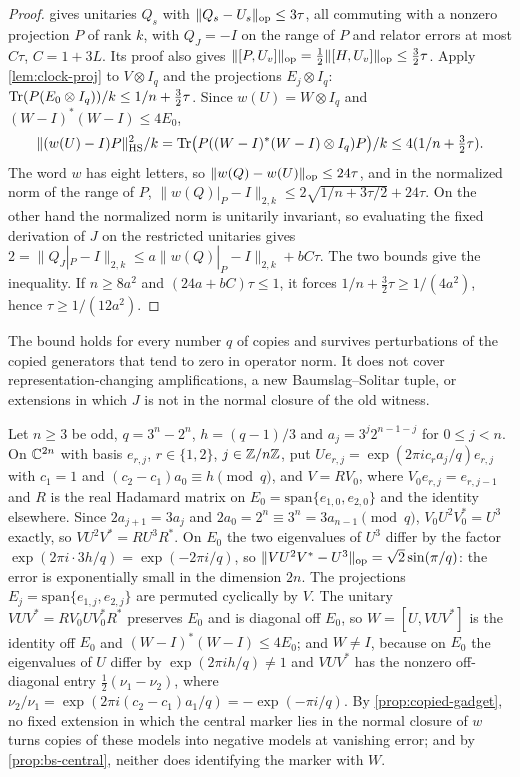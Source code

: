 \begin{proof}
 gives unitaries $Q_s$ with $\lVert Q_s-U_s\rVert_{\mathrm{op}}\le3\tau$, all commuting with a nonzero projection $P$ of rank $k$,
with $Q_J=-I$ on the range of $P$ and relator errors at most $C\tau$, $C=1+3L$. Its proof also gives
$\lVert [P,U_v]\rVert_{\mathrm{op}}=\frac12\lVert [H,U_v]\rVert_{\mathrm{op}}\le\frac32\tau$. Apply \cref{lem:clock-proj} to $V\otimes I_q$ and the projections $E_j\otimes I_q$:
$\operatorname{Tr}(P(E_0\otimes I_q))/k\le1/n+\frac32\tau$. Since $w(U)=W\otimes I_q$ and $(W-I)^*(W-I)\le4E_0$,
\[
\|(w(U)-I)P\|_{\mathrm{HS}}^2/k=\operatorname{Tr}\bigl(P((W-I)^*(W-I)\otimes I_q)P\bigr)/k\le4(1/n+\tfrac32\tau).
\]
The word $w$ has eight letters, so $\lVert w(Q)-w(U)\rVert_{\mathrm{op}}\le24\tau$, and in the normalized norm of the range of $P$,
$\|w(Q)|_P-I\|_{2,k}\le2\sqrt{1/n+3\tau/2}+24\tau$. On the other hand the normalized norm is unitarily invariant, so evaluating the
fixed derivation of $J$ on the restricted unitaries gives
$2=\|Q_J|_P-I\|_{2,k}\le a\|w(Q)|_P-I\|_{2,k}+bC\tau$. The two bounds give the inequality. If $n\ge8a^2$ and $(24a+bC)\tau\le1$, it
forces $1/n+\frac32\tau\ge1/(4a^2)$, hence $\tau\ge1/(12a^2)$.
\end{proof}

The bound holds for every number $q$ of copies and survives perturbations of the copied generators that tend to zero in operator
norm. It does not cover representation-changing amplifications, a new Baumslag--Solitar tuple, or extensions in which $J$ is not in
the normal closure of the old witness.

\begin{example}\label{ex:thin-bs}
Let $n\ge3$ be odd, $q=3^n-2^n$, $h=(q-1)/3$ and $a_j=3^j2^{n-1-j}$ for $0\le j<n$. On $\mathbb C^{2n}$ with basis $e_{r,j}$, $r\in\{1,2\}$,
$j\in\mathbb Z/n\mathbb Z$, put $Ue_{r,j}=\exp(2\pi ic_ra_j/q)e_{r,j}$ with $c_1=1$ and $(c_2-c_1)a_0\equiv h\pmod q$, and $V=RV_0$, where
$V_0e_{r,j}=e_{r,j-1}$ and $R$ is the real Hadamard matrix on $E_0=\mathrm{span}\{e_{1,0},e_{2,0}\}$ and the identity elsewhere. Since
$2a_{j+1}=3a_j$ and $2a_0=2^n\equiv3^n=3a_{n-1}\pmod q$, $V_0U^2V_0^*=U^3$ exactly, so $VU^2V^*=RU^3R^*$. On $E_0$ the two eigenvalues of
$U^3$ differ by the factor $\exp(2\pi i\cdot3h/q)=\exp(-2\pi i/q)$, so $\lVert VU^2V^*-U^3\rVert_{\mathrm{op}}=\sqrt2\sin(\pi/q)$: the error is exponentially
small in the dimension $2n$. The projections $E_j=\mathrm{span}\{e_{1,j},e_{2,j}\}$ are permuted cyclically by $V$. The unitary
$VUV^*=RV_0UV_0^*R^*$ preserves $E_0$ and is diagonal off $E_0$, so $W=[U,VUV^*]$ is the identity off $E_0$ and
$(W-I)^*(W-I)\le4E_0$; and $W\ne I$, because on $E_0$ the eigenvalues of $U$ differ by $\exp(2\pi ih/q)\ne1$ and $VUV^*$ has the nonzero
off-diagonal entry $\frac12(\nu_1-\nu_2)$, where $\nu_2/\nu_1=\exp(2\pi i(c_2-c_1)a_1/q)=-\exp(-\pi i/q)$. By
\cref{prop:copied-gadget}, no fixed extension in which the central marker lies in the normal closure of $w$ turns copies of these
models into negative models at vanishing error; and by \cref{prop:bs-central}, neither does identifying the marker with $W$.
\end{example}

